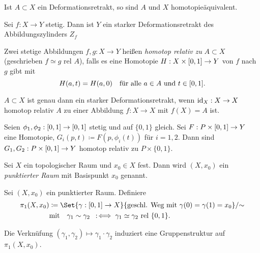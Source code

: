 \documentclass{cheat-sheet}
\newcommand{\rel}{\text{ rel }} %
\begin{document}
\begin{bem}
  Ist $A \subset X$ ein Deformationsretrakt, so sind $A$ und $X$ homotopieäquivalent.
\end{bem}

\begin{bsp}
  Sei $f : X \to Y$ stetig. Dann ist $Y$ ein starker Deformationsretrakt des Abbildungszylinders $Z_f$
\end{bsp}


\begin{defn}
  Zwei stetige Abbildungen $f, g : X \to Y$ heißen \emph{homotop relativ zu} $A \subset X$ (geschrieben $f \simeq g \rel A$), falls es eine Homotopie $H : X \times \left[ 0, 1 \right] \to Y$ von $f$ nach $g$ gibt mit
  \[
    H(a,t) = H(a,0) \quad
    \text{für alle $a \in A$ und $t \in \left[ 0, 1 \right]$.}
  \]
\end{defn}

\begin{bem}
  $A \subset X$ ist genau dann ein starker Deformationsretrakt, wenn $\mathrm{id}_X : X \to X$ homotop relativ $A$ zu einer Abbildung $f : X \to X$ mit $f(X) = A$ ist.
\end{bem}

\begin{lem}[Reparametrisierungslemma]
  Seien $\phi_1, \phi_2 : \left[ 0, 1 \right] \to \left[ 0, 1 \right]$ stetig und auf $\{ 0, 1 \}$ gleich. Sei $F : P \times \left[ 0, 1 \right] \to Y$ eine Homotopie, $G_i(p, t) \coloneqq F(p, \phi_i(t))$ für $i = 1,2$. Dann sind $G_1, G_2 : P \times \left[ 0, 1 \right] \to Y$ homotop relativ zu $P \times \{ 0, 1 \}$.
\end{lem}

\begin{defn}
  Sei $X$ ein topologischer Raum und $x_0 \in X$ fest. Dann wird $(X, x_0)$ ein \emph{punktierter Raum} mit Basispunkt $x_0$ genannt.
\end{defn}

\begin{defn}
  Sei $(X, x_0)$ ein punktierter Raum. Definiere
  \begin{align*}
    \pi_1(X, x_0) &\coloneqq \Set{ \gamma : \I \to X }{ \text{geschl. Weg mit } \gamma(0) = \gamma(1) = x_0 } / {\sim}\\
    & \text{mit} \quad \gamma_1 \sim \gamma_2 \coloniff \gamma_1 \simeq \gamma_2 \rel \{0,1\}.
  \end{align*}
\end{defn}

\begin{prop}
  Die Verknüfung $(\gamma_1, \gamma_2) \mapsto \gamma_1 \cdot \gamma_2$ induziert eine Gruppenstruktur auf $\pi_1(X, x_0)$.
\end{prop}
\end{document}
